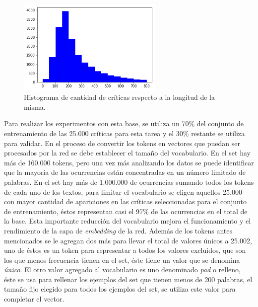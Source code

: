 \documentclass[spanish]{article}
\theoremstyle{definition}
\theoremstyle{remark}
\numberwithin{equation}{section}
\numberwithin{equation}{section} %
\begin{document}
\begin{figure}[H]
\centering
\includegraphics[width=7cm]{img/DistributionIMDB.png}
\caption[Distribución \textit{IMDB}]{\footnotesize{ Histograma de cantidad de críticas respecto a la longitud de la misma. }}
\label{fig:IMDBDistribution}
\end{figure}
Para realizar los experimentos con esta base, se utiliza un 70\% del conjunto de entrenamiento de las 25.000 críticas para esta tarea y el 30\% restante se utiliza para validar. En el proceso de convertir los tokens en vectores que puedan ser procesados por la red se debe establecer el tamaño del vocabulario. En el set hay más de 160.000 tokens, pero una vez más analizando los datos se puede identificar que la mayoría de las ocurrencias están concentradas en un número limitado de palabras. En el set hay más de 1.000.000 de ocurrencias sumando todos los tokens de cada uno de los textos, para limitar el vocabulario se eligen aquellos 25.000 con mayor cantidad de apariciones en las críticas seleccionadas para el conjunto de entrenamiento, éstos representan casi el 97\% de las ocurrencias en el total de la base. Esta importante reducción del vocabulario mejora el funcionamiento y el rendimiento de la capa de \textit{embedding} de la red. Además de los tokens antes mencionados se le agregan dos más para llevar el total de valores únicos a 25.002, uno de éstos es un token para representar a todos los valores excluidos, que son los que menos frecuencia tienen en el set, éste tiene un valor que se denomina \textit{único}. El otro valor agregado al vocabulario es uno denominado \textit{pad} o relleno, éste se usa para rellenar los ejemplos del set que tienen menos de 200 palabras, el tamaño fijo elegido para todos los ejemplos del set, se utiliza este valor para completar el vector.  
\par
\end{document}
